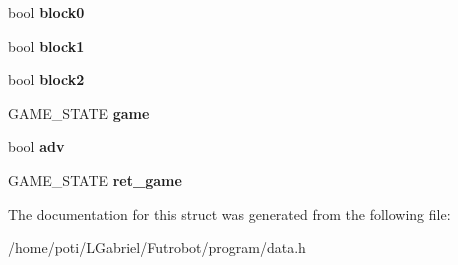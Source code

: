 \begin{DoxyCompactItemize}
\item 
bool {\bfseries block0}\hypertarget{structPACKAGEDAT_a4ebaf69d9922f12060981fc178b4a846}{}\label{structPACKAGEDAT_a4ebaf69d9922f12060981fc178b4a846}

\item 
bool {\bfseries block1}\hypertarget{structPACKAGEDAT_a296fe358b104f262ccb1743ba0c6abe2}{}\label{structPACKAGEDAT_a296fe358b104f262ccb1743ba0c6abe2}

\item 
bool {\bfseries block2}\hypertarget{structPACKAGEDAT_a9cc16ffa4a7ba35fd1896e8b0dd486aa}{}\label{structPACKAGEDAT_a9cc16ffa4a7ba35fd1896e8b0dd486aa}

\item 
G\+A\+M\+E\+\_\+\+S\+T\+A\+TE {\bfseries game}\hypertarget{structPACKAGEDAT_ab1e5f5c8e22f0b5a80c3aab7147c15f4}{}\label{structPACKAGEDAT_ab1e5f5c8e22f0b5a80c3aab7147c15f4}

\item 
bool {\bfseries adv}\hypertarget{structPACKAGEDAT_a93f4873d7cb22c6aa4c316dffacc2b0c}{}\label{structPACKAGEDAT_a93f4873d7cb22c6aa4c316dffacc2b0c}

\item 
G\+A\+M\+E\+\_\+\+S\+T\+A\+TE {\bfseries ret\+\_\+game}\hypertarget{structPACKAGEDAT_a4484d919c2c1cec02b593fe7aed908c9}{}\label{structPACKAGEDAT_a4484d919c2c1cec02b593fe7aed908c9}

\end{DoxyCompactItemize}


The documentation for this struct was generated from the following file\+:\begin{DoxyCompactItemize}
\item 
/home/poti/\+L\+Gabriel/\+Futrobot/program/data.\+h\end{DoxyCompactItemize}
